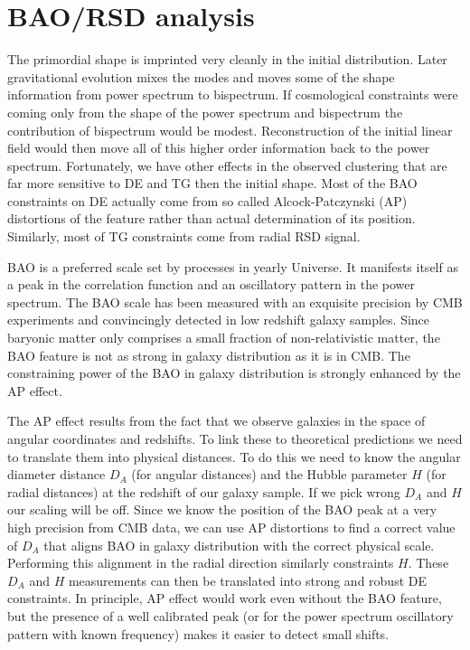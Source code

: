 \section{BAO/RSD analysis}

The primordial shape is imprinted very cleanly in the initial distribution. Later gravitational evolution mixes the modes and moves some of the shape information
from power spectrum to bispectrum. If cosmological constraints were coming only from the shape of the power spectrum and bispectrum the contribution of bispectrum 
would be modest. Reconstruction of the initial linear field would then move all of this higher order information back to the power spectrum.
Fortunately, we have other effects in the observed clustering that are far more sensitive to DE and TG then the initial shape. Most of the BAO constraints
on DE actually come from so called Alcock-Patczynski (AP) distortions of the feature rather than actual determination of its position. Similarly, most
of TG constraints come from radial RSD signal.

BAO is a preferred scale set by processes in yearly Universe. It manifests itself as a peak in the correlation function and an oscillatory pattern
in the power spectrum. The BAO scale has been measured with an exquisite precision by CMB experiments and convincingly detected in low redshift galaxy samples.
Since baryonic matter only comprises a small fraction of non-relativistic matter, the BAO feature is not as strong in galaxy distribution as it is in CMB.
The constraining power of the BAO in galaxy distribution is strongly enhanced by the AP effect.

The AP effect results from the fact that we observe galaxies in the space of angular coordinates and redshifts. To link these to theoretical 
predictions we need to translate them into physical distances. To do this we need to know the angular diameter distance $D_A$ (for angular distances) 
and the Hubble parameter $H$ (for radial distances) at the redshift of our galaxy sample. If we pick wrong $D_A$ and $H$ our scaling will be off.
Since we know the position of the BAO peak at a very high precision from CMB data, we can use AP distortions to find a correct value of $D_A$ that aligns
BAO in galaxy distribution with the correct physical scale. Performing this alignment in the radial direction similarly constraints $H$. These $D_A$ and
$H$ measurements can then be translated into strong and robust DE constraints. In principle, AP effect would work even without the BAO feature, but the
presence of a well calibrated peak (or for the power spectrum oscillatory pattern with known frequency) makes it easier to detect small shifts.

